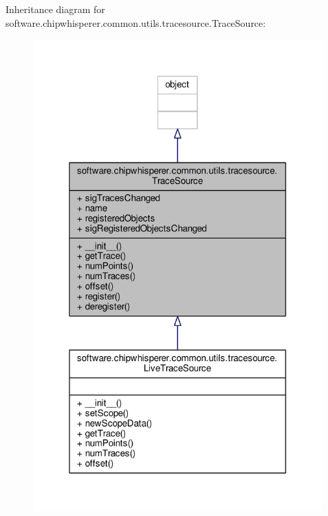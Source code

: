 Inheritance diagram for software.\+chipwhisperer.\+common.\+utils.\+tracesource.\+Trace\+Source\+:\nopagebreak
\begin{figure}[H]
\begin{center}
\leavevmode
\includegraphics[width=316pt]{de/da8/classsoftware_1_1chipwhisperer_1_1common_1_1utils_1_1tracesource_1_1TraceSource__inherit__graph}
\end{center}
\end{figure}


